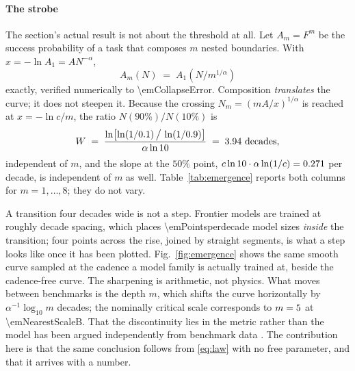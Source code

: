 \documentclass[conference]{IEEEtran}
\theoremstyle{definition}
\begin{document}
\paragraph{The strobe} The section's actual result is not about the threshold at
all. Let $A_m=F^m$ be the success probability of a task that composes $m$ nested
boundaries. With $x=-\ln A_1=AN^{-\alpha}$,
\begin{equation}
A_m(N) \;=\; A_1\!\left(N/m^{1/\alpha}\right)
\label{eq:collapse}
\end{equation}
exactly, verified numerically to \num{\emCollapseError}. Composition
\emph{translates} the curve; it does not steepen it. Because the crossing
$N_m=(mA/x)^{1/\alpha}$ is reached at $x=-\ln c/m$, the ratio $N(90\%)/N(10\%)$
is
\begin{equation}
W \;=\; \frac{\ln\!\left[\ln(1/0.1)\,\big/\,\ln(1/0.9)\right]}{\alpha\ln 10}
\;=\; 3.94\ \text{decades},
\label{eq:width}
\end{equation}
independent of $m$, and the slope at the $50\%$ point,
$c\ln 10\cdot\alpha\ln(1/c)=0.271$ per decade, is independent of $m$ as well.
Table~\ref{tab:emergence} reports both columns for $m=1,\dots,8$; they do not
vary.

A transition four decades wide is not a step. Frontier models are trained at
roughly decade spacing, which places \num{\emPointsperdecade} model sizes
\emph{inside} the transition; four points across the rise, joined by straight
segments, is what a step looks like once it has been plotted. Fig.~\ref{fig:emergence}
shows the same smooth curve sampled at the cadence a model family is actually
trained at, beside the cadence-free curve. The sharpening is arithmetic, not
physics. What moves between benchmarks is the depth $m$, which shifts the curve
horizontally by $\alpha^{-1}\log_{10}m$ decades; the nominally critical scale
corresponds to $m=5$ at \num{\emNearestScale}B. That the
discontinuity lies in the metric rather than the model has been argued
independently from benchmark data \cite{schaeffer2023}. The contribution here is
that the same conclusion follows from \eqref{eq:law} with no free parameter, and
that it arrives with a number.

\begin{table}[t]
\centering
\caption{Experiment F. Where a task of depth $m$ crosses $50\%$, and the width of
its $10$--$90\%$ transition. The last column is constant because $m$ cancels
from the ratio of the two crossings, \eqref{eq:width}.}
\label{tab:emergence}
\footnotesize

\end{table}
\end{document}
